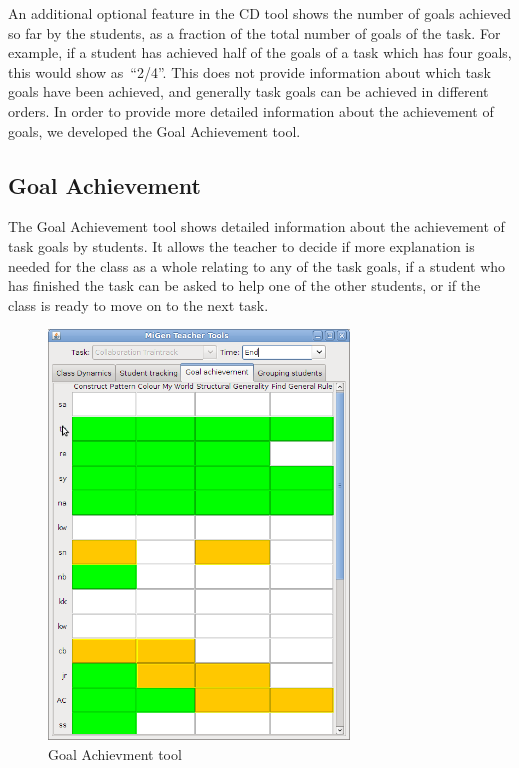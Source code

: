 An additional optional feature in the CD tool shows the number of
goals achieved so far by the students, as a fraction of the total
number of goals of the task. For example, if a student has achieved
half of the goals of a task which has four goals, this would show 
as~“2/4”. This does not provide information about which task goals have
been achieved, and generally task goals can be achieved in different
orders. In order to provide more detailed information about the
achievement of goals, we developed the Goal Achievement tool.


\subsection{Goal Achievement}
\label{sec:goal-achievement}

The Goal Achievement tool shows detailed information about the
achievement of task goals by students. It allows the teacher to decide
if more explanation is needed for the class as a whole relating to any
of the task goals, if a student who has finished the task can be asked
to help one of the other students, or if the class is ready to move on
to the next task. 

\begin{figure}[hbtp]
  \centering
  \includegraphics[width=8cm]{gfx/ta-ga}
  \caption{Goal Achievment tool}
  \label{fig:goal-a}
\end{figure}

